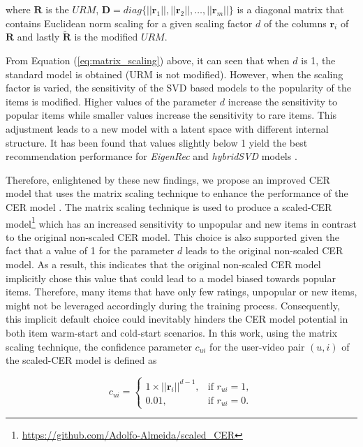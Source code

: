 \documentclass[review]{elsarticle}
\begin{document}
\noindent where $\mathbf{R}$ is the $URM$, $\mathbf{D} = diag\{||\mathbf{r}_1||, ||\mathbf{r}_2||, \dots, ||\mathbf{r}_m||\}$ is a diagonal matrix that contains Euclidean norm scaling for a given scaling factor $d$ of the columns $\mathbf{r}_i$ of $\mathbf{R}$ and lastly $\widetilde{\mathbf{R}}$ is the modified $URM$. 

From Equation (\ref{eq:matrix_scaling}) above, it can seen that when $d$ is 1, the standard model is obtained (\ac{URM} is not modified). However, when the scaling factor is varied, the sensitivity of the SVD based models to the popularity of the items is modified. Higher values of the parameter $d$ increase the sensitivity to popular items while smaller values increase the sensitivity to rare items. This adjustment leads to a new model with a latent space with different internal structure. It has been found that values slightly below 1 yield the best recommendation performance for \textit{EigenRec} and \textit{hybridSVD} models \citep{nikolakopoulos2019eigenrec,frolov2019hybridsvd}. 

Therefore, enlightened by these new findings, we propose an improved CER model that uses the matrix scaling technique to enhance the performance of the CER model \citep{du2018personalized}. The matrix scaling technique is used to produce a scaled-CER model\footnote{\href{https://github.com/Adolfo-Almeida/scaled_CER}{https://github.com/Adolfo-Almeida/scaled\_CER}} which has an increased sensitivity to unpopular and new items in contrast to the original non-scaled CER model. This choice is also supported given the fact that a value of 1 for the parameter $d$ leads to the original non-scaled CER model. As a result, this indicates that the original non-scaled CER model implicitly chose this value that could lead to a model biased towards popular items. Therefore, many items that have only few ratings, unpopular or new items, might not be leveraged accordingly during the training process. Consequently, this implicit default choice could inevitably hinders the CER model potential in both item warm-start and cold-start scenarios. In this work, using the matrix scaling technique, the confidence parameter $c_{ui}$ for the user-video pair $(u,i)$ of the scaled-CER model is defined as 

\begin{equation}
    c_{ui} = \begin{cases}
    1 \times ||\mathbf{r}_i||^{d-1}, & \text{if $r_{ui} = 1$},\\
    0.01, & \text{if $r_{ui} = 0$}.
  \end{cases}
\end{equation}
\end{document}
